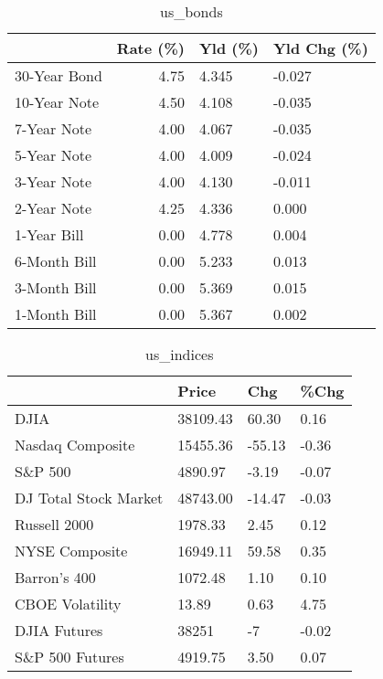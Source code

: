 \documentclass{article}%
\begin{document}
%


\begin{table}[htbp]%
\caption{us\_bonds}%
\centering%
\begin{adjustbox}{width=1\textwidth}%
\begin{tabular}{lrll}
\toprule
             &  Rate (\%) & Yld (\%) & Yld Chg (\%) \\
\midrule
30-Year Bond &      4.75 &   4.345 &      -0.027 \\
10-Year Note &      4.50 &   4.108 &      -0.035 \\
 7-Year Note &      4.00 &   4.067 &      -0.035 \\
 5-Year Note &      4.00 &   4.009 &      -0.024 \\
 3-Year Note &      4.00 &   4.130 &      -0.011 \\
 2-Year Note &      4.25 &   4.336 &       0.000 \\
 1-Year Bill &      0.00 &   4.778 &       0.004 \\
6-Month Bill &      0.00 &   5.233 &       0.013 \\
3-Month Bill &      0.00 &   5.369 &       0.015 \\
1-Month Bill &      0.00 &   5.367 &       0.002 \\
\bottomrule
\end{tabular}
%
\end{adjustbox}%
\end{table}

%


\begin{table}[htbp]%
\caption{us\_indices}%
\centering%
\begin{adjustbox}{width=1\textwidth}%
\begin{tabular}{llll}
\toprule
                      &    Price &    Chg &  \%Chg \\
\midrule
                 DJIA & 38109.43 &  60.30 &  0.16 \\
     Nasdaq Composite & 15455.36 & -55.13 & -0.36 \\
              S\&P 500 &  4890.97 &  -3.19 & -0.07 \\
DJ Total Stock Market & 48743.00 & -14.47 & -0.03 \\
         Russell 2000 &  1978.33 &   2.45 &  0.12 \\
       NYSE Composite & 16949.11 &  59.58 &  0.35 \\
         Barron's 400 &  1072.48 &   1.10 &  0.10 \\
      CBOE Volatility &    13.89 &   0.63 &  4.75 \\
         DJIA Futures &    38251 &     -7 & -0.02 \\
      S\&P 500 Futures &  4919.75 &   3.50 &  0.07 \\
\bottomrule
\end{tabular}
%
\end{adjustbox}%
\end{table}
\end{document}
